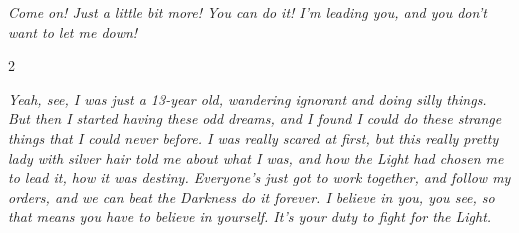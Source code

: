 \noindent\textit{Come on! Just a little bit more! You can do it! I'm leading you, and you don't want to let me down! }\begin{multicols}{2}\raggedcolumns







\textit{Yeah, see, I was just a 13-year old, wandering ignorant and doing silly things. But then I started having these odd dreams, and I found I could do these strange things that I could never before. I was really scared at first, but this really pretty lady with silver hair told me about what I was, and how the Light had chosen me to lead it, how it was destiny. Everyone's just got to work together, and follow my orders, and we can beat the Darkness do it forever. I believe in you, you see, so that means you have to believe in yourself. It's your duty to fight for the Light.}


\end{multicols}
